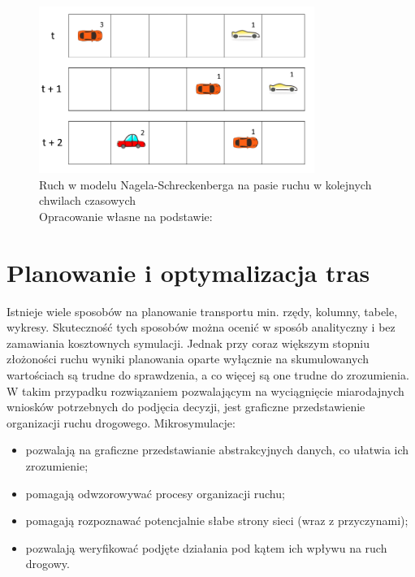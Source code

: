 \documentclass{sprawozdanie-agh}
\begin{document}
		\begin{figure}[H]
			\centering
			\captionsetup{justification=centering}
			\includegraphics[width=0.8\textwidth]{ruchModel}
			\caption{Ruch w modelu Nagela-Schreckenberga na pasie ruchu w kolejnych chwilach czasowych \\ Opracowanie własne na podstawie: \cite{formalizacjaDudekWas}}
			
			\label{fig:N-Sch_1}
		\end{figure}



	\section{Planowanie i optymalizacja tras}

	Istnieje wiele sposobów na planowanie transportu min. rzędy, kolumny, tabele, wykresy. Skuteczność tych sposobów można ocenić w sposób analityczny i bez zamawiania kosztownych symulacji. Jednak przy coraz większym stopniu złożoności ruchu wyniki planowania oparte wyłącznie na skumulowanych wartościach są trudne do sprawdzenia, a co więcej są one trudne do zrozumienia. W takim przypadku rozwiązaniem pozwalającym na wyciągnięcie miarodajnych wniosków potrzebnych do podjęcia decyzji, jest graficzne przedstawienie organizacji ruchu drogowego. Mikrosymulacje:

	\begin{itemize}
		\item pozwalają na graficzne przedstawianie abstrakcyjnych danych, co ułatwia ich zrozumienie;
		\item pomagają odwzorowywać procesy organizacji ruchu;
		\item pomagają rozpoznawać potencjalnie słabe strony sieci (wraz z przyczynami);
		\item pozwalają weryfikować podjęte działania pod kątem ich wpływu na ruch drogowy.
	\end{itemize}
\end{document}
